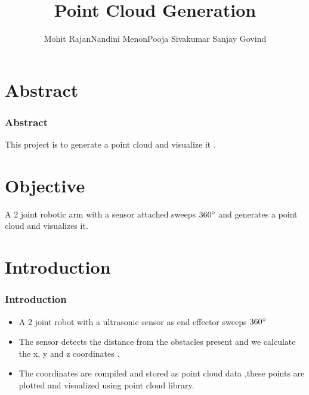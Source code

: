 \documentclass{beamer}
\title[Design Project]{Point Cloud Generation}
\author{Mohit Rajan\newline Nandini Menon\newline Pooja Sivakumar   \newline Sanjay Govind}
\institute[FISAT] %
{
FISAT \\ %
\medskip
}
\begin{document}
\begin{frame}
\titlepage %
\end{frame}



\section{Abstract} %

\begin{frame}
\frametitle{Abstract}
\par This project is to generate a point cloud  and visualize it  .
\end{frame}

\section{Objective}
\begin{frame}
\par A 2 joint robotic arm with a sensor attached sweeps $360\degree$  and generates a point cloud and visualizes it.
\end{frame}



\section{Introduction}

\begin{frame}
\frametitle{Introduction}
\begin{itemize}
\item A 2 joint robot with a  ultrasonic sensor as end effector sweeps $360\degree$
\item The sensor detects the distance  from  the obstacles present and we calculate the x, y and z coordinates .
\item The coordinates are compiled and stored as point cloud data ,these points are plotted and visualized using point cloud library.
\end{itemize}
\end{frame}
\end{document}
